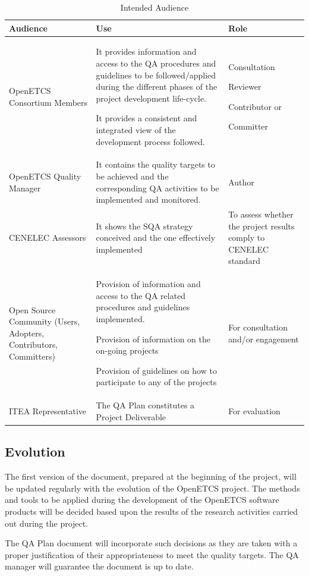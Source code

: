 \documentclass{template/openetcs_article}
\begin{document}
\begin{table} [H]
\begin{tabular}{|m{3cm}|m{9cm}|m{3cm}|}
\hline
\rowcolor{myblue}
Audience &
Use &
Role\\\hline
OpenETCS Consortium Members &
It provides information and access to the QA procedures and guidelines to be followed/applied during the different phases of the project development life-cycle.

It provides a consistent and integrated view of the development process followed.
&
Consultation

Reviewer

Contributor or 

Committer
\\\hline
OpenETCS Quality Manager &
It contains the quality targets to be achieved and the corresponding QA activities to be implemented and monitored. &
Author\\\hline
CENELEC Assessors &
It shows the SQA strategy conceived and the one effectively implemented &
To assess whether the project results comply to CENELEC standard\\\hline
Open Source Community (Users, Adopters, Contributors, Committers) &
Provision of information and access to the QA related procedures and guidelines implemented.

Provision of information on the on-going projects

Provision of guidelines on how to participate to any of the projects
&
For consultation and/or engagement\\\hline
ITEA Representative &
The QA Plan constitutes a Project Deliverable &
For evaluation \\\hline
\end{tabular}
\caption{Intended Audience}
\end{table}


\subsection{Evolution}

The first version of the document, prepared at the beginning of the project, will be updated regularly with the evolution of the OpenETCS project. The methods and tools to be applied during the development of the OpenETCS software products will be decided based upon the results of the research activities carried out during the project. 

The QA Plan document will incorporate such decisions as they are taken with a proper justification of their appropriateness to meet the quality targets. The QA manager will guarantee the document is up to date.  
\end{document}
